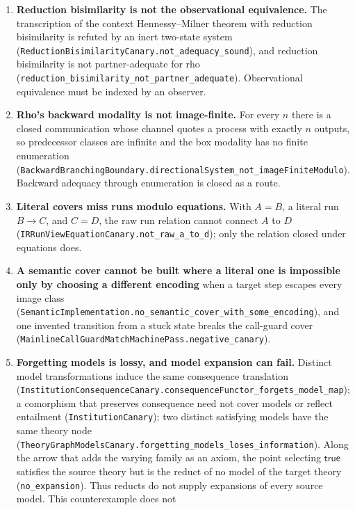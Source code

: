 \documentclass[11pt]{article}
\theoremstyle{definition}
\theoremstyle{remark}
\begin{document}
\begin{enumerate}
  have that type. The resulting \nolinkurl{no_root_preservation} excludes
  admission based only on the declaration type and conversion qualification.
\item \textbf{Reduction bisimilarity is not the observational equivalence.}
  The transcription of the context Hennessy--Milner theorem with reduction
  bisimilarity is refuted by an inert two-state system
  (\nolinkurl{ReductionBisimilarityCanary.not_adequacy_sound}), and reduction
  bisimilarity is not partner-adequate for rho
  (\nolinkurl{reduction_bisimilarity_not_partner_adequate}).  Observational
  equivalence must be indexed by an observer.
\item \textbf{Rho's backward modality is not image-finite.}  For every $n$
  there is a closed communication whose channel quotes a process with exactly
  $n$ outputs, so predecessor classes are infinite and the box modality has
  no finite enumeration
  (\nolinkurl{BackwardBranchingBoundary.directionalSystem_not_imageFiniteModulo}).
  Backward adequacy through enumeration is closed as a route.
\item \textbf{Literal covers miss runs modulo equations.}  With $A=B$, a
  literal run $B\to C$, and $C=D$, the raw run relation cannot connect $A$ to
  $D$ (\nolinkurl{IRRunViewEquationCanary.not_raw_a_to_d}); only the relation
  closed under equations does.
\item \textbf{A semantic cover cannot be built where a literal one is
  impossible only by choosing a different encoding} when a target step
  escapes every image class
  (\nolinkurl{SemanticImplementation.no_semantic_cover_with_some_encoding}),
  and one invented transition from a stuck state breaks the call-guard cover
  (\nolinkurl{MainlineCallGuardMatchMachinePass.negative_canary}).
\item \textbf{Forgetting models is lossy, and model expansion can fail.}
  Distinct model transformations induce the same consequence translation
  (\nolinkurl{InstitutionConsequenceCanary.consequenceFunctor_forgets_model_map});
  a comorphism that preserves consequence need not cover models or reflect
  entailment (\texttt{InstitutionCanary}); two distinct satisfying models
  have the same theory node
  (\nolinkurl{TheoryGraphModelsCanary.forgetting_models_loses_information}).
  Along the arrow that adds the varying family as an axiom, the point
  selecting $\mathsf{true}$ satisfies the source theory but is the reduct of
  no model of the target theory (\texttt{no\_expansion}). Thus reducts do
  not supply expansions of every source model. This counterexample does not

\end{enumerate}
\end{document}
